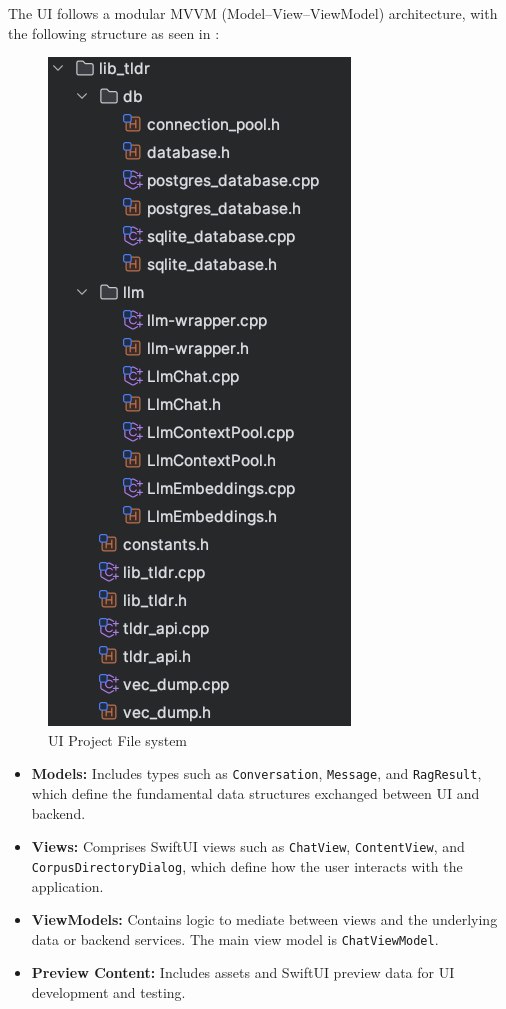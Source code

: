 The UI follows a modular MVVM (Model–View–ViewModel) architecture, with the following structure as seen in :
\begin{figure}[H]
    \centering
    \includegraphics[width=0.5\linewidth]{images/ui-proj-fs.png}
    \caption{UI Project File system}
    \label{fig:tldrUIFs}
\end{figure}
\begin{itemize}
    \item \textbf{Models:} Includes types such as \texttt{Conversation}, \texttt{Message}, and \texttt{RagResult}, which define the fundamental data structures exchanged between UI and backend.
    \item \textbf{Views:} Comprises SwiftUI views such as \texttt{ChatView}, \texttt{ContentView}, and \texttt{CorpusDirectoryDialog}, which define how the user interacts with the application.
    \item \textbf{ViewModels:} Contains logic to mediate between views and the underlying data or backend services. The main view model is \texttt{ChatViewModel}.
    \item \textbf{Preview Content:} Includes assets and SwiftUI preview data for UI development and testing.
\end{itemize}

